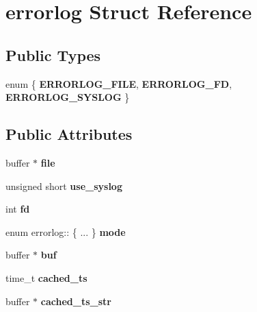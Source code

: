 \hypertarget{structerrorlog}{
\section{errorlog Struct Reference}
\label{structerrorlog}
}
\subsection*{Public Types}
\begin{CompactItemize}
\item 
enum \{ \textbf{ERRORLOG\_\-FILE}, 
\textbf{ERRORLOG\_\-FD}, 
\textbf{ERRORLOG\_\-SYSLOG}
 \}
\subsection*{Public Attributes}
\begin{CompactItemize}
\item 
\hypertarget{structerrorlog_91c64c945bcc42d0c568986ebc56aec6}{
buffer $\ast$ \textbf{file}}
\label{structerrorlog_91c64c945bcc42d0c568986ebc56aec6}

\item 
\hypertarget{structerrorlog_819e991bf71f814ce719f2bbc54f0c3c}{
unsigned short \textbf{use\_\-syslog}}
\label{structerrorlog_819e991bf71f814ce719f2bbc54f0c3c}

\item 
\hypertarget{structerrorlog_7c742fe7ce6efd7d689e4be156ba5a03}{
int \textbf{fd}}
\label{structerrorlog_7c742fe7ce6efd7d689e4be156ba5a03}

\item 
\hypertarget{structerrorlog_d8f03d4f8a50455a5e008da0e3e491db}{
enum errorlog:: \{ ... \}  \textbf{mode}}
\label{structerrorlog_d8f03d4f8a50455a5e008da0e3e491db}

\item 
\hypertarget{structerrorlog_6c5005571427e17c515dd26844db1ea1}{
buffer $\ast$ \textbf{buf}}
\label{structerrorlog_6c5005571427e17c515dd26844db1ea1}

\item 
\hypertarget{structerrorlog_79fa384854edf62041ab26fd07cde87b}{
time\_\-t \textbf{cached\_\-ts}}
\label{structerrorlog_79fa384854edf62041ab26fd07cde87b}

\item 
\hypertarget{structerrorlog_567be0d81abbaf275cb070b980855f47}{
buffer $\ast$ \textbf{cached\_\-ts\_\-str}}
\label{structerrorlog_567be0d81abbaf275cb070b980855f47}


\end{CompactItemize}
\end{CompactItemize}
